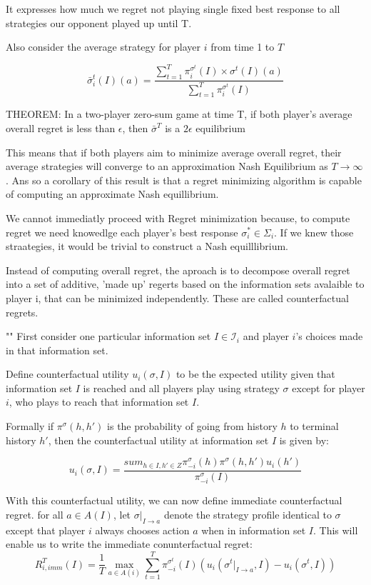 \documentclass{article}
\begin{document}
It expresses how much we regret not playing single fixed best response to all strategies our opponent played up until T. 

Also consider the average strategy for player $i$ from time 1 to $T$

\[ \bar\sigma^t_i (I)(a) = \frac
{\sum_{t=1}^T \pi_i^{\sigma^t}(I) \times  \sigma^t (I)(a)} 
{\sum_{t=1}^T \pi_i^{\sigma^t}(I)} \]

THEOREM: In a two-player zero-sum game at time T, if both player's average overall regret is less than $\epsilon$, then $\bar\sigma^T$ is a $2 \epsilon$ equilibrium

This means that if both players aim to minimize average overall regret, their average strategies will converge to an approximation Nash Equilibrium as $T \to \infty$. Ans so a corollary of this result is that a regret minimizing algorithm is capable of computing an approximate Nash equillibrium. 

We cannot immediatly proceed with Regret minimization because, to compute regret we need knowedlge each player's best response $\sigma^*_i \in \Sigma_i$. If we knew those straategies, it would be trivial to construct a Nash equilllibrium. 

Instead of computing overall regret, the aproach is to decompose overall regret into a set of additive, 'made up' regerts based on the information sets avalaible to player i, that can be minimized independently. These are called counterfactual regrets. 

""
First consider one particular information set $I \in \mathcal{I}_i$ and player $i$’s choices made in that
information set.

Define counterfactual utility $ u_i({\sigma}, I )$ to be the expected utility given that information set $I$ is reached and all players play using strategy $\sigma$ except for player $i$, who plays to reach that information set $I$.


Formally if $\pi ^{\sigma}(h, h')$ is the probability of going from history $h$ to terminal history $h'$, then the counterfactual utility at information set $I$ is given by:

\[ u_i(\sigma, I) = \frac{sum_{h \in I, h' \in Z} \pi_{-i}^{\sigma}(h) \pi^{\sigma}(h, h')u_i(h')}{\pi_{-i}^{\sigma}(I)} \]

With this counterfactual utility, we can now define immediate counterfactual regret. for all $a \in A(I)$, let $\sigma|_{I \rightarrow a}$ denote the strategy profile identical to $\sigma$ except that player $i$ always chooses action $a$ when in information set $I$. This will enable us to write the immediate conunterfactual regret: 
\[
R_{i, imm}^T(I) = \frac{1}{T} \max_{a \in A(i)} \sum_{t=1}^T \pi_{-i}^{\sigma^t}(I)(u_i(\sigma^t|_{I \rightarrow a}, I) - u_i(\sigma^t, I)) 
\]
\end{document}
